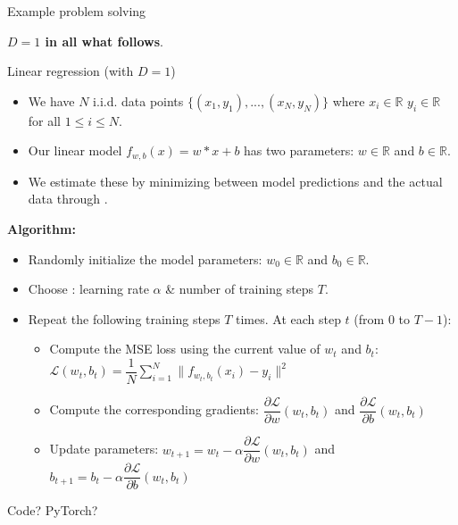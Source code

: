 \begin{frame}{Example problem solving}
\begin{minipage}{0.4\linewidth}
\begin{figure}
\end{figure}
\end{minipage}

\textbf{$D=1$ in all what follows}.
\end{frame}


\begin{frame}{Linear regression (with $D=1$)}
\vspace{-5mm}
\begin{itemize}
\item We have $N$ i.i.d. data points $\{(x_1, y_1), ..., (x_N, y_N)\}$ where $x_i\in \mathbb{R}$ $y_i\in \mathbb{R}$ for all $1 \leq i \leq N$.\\
\item Our linear model $f_{w, b}(x) = w * x + b$ has two parameters: $w \in \mathbb{R}$ and $b \in \mathbb{R}$.
\item We estimate these  by minimizing  between model predictions and the actual data through .
\end{itemize}
\vsp
\pause
\textbf{Algorithm:}
\begin{itemize}
\item Randomly initialize the model parameters: $w_0 \in \mathbb{R}$ and $b_0 \in \mathbb{R}$.
\item Choose : learning rate $\alpha$ \& number of training steps $T$.
\item Repeat the following training steps $T$ times. At each step $t$ (from 0 to $T-1$):
\vspace{-3mm}
\begin{itemize}
\item Compute the MSE loss using the current value of $w_t$ and $b_t$: $\displaystyle \mathcal{L}(w_t, b_t) = \dfrac{1}{N} \sum_{i=1}^N \|f_{w_t, b_t}(x_i) - y_i  \|^2$
\item Compute the corresponding gradients: $\dfrac{\partial \mathcal{L}}{\partial w}(w_t, b_t)$ and $\dfrac{\partial \mathcal{L}}{\partial b}(w_t, b_t)$
\item Update parameters: $w_{t+1} = w_{t} - \alpha \dfrac{\partial \mathcal{L}}{\partial w}(w_t, b_t)$ and   $b_{t+1} = b_{t} - \alpha \dfrac{\partial \mathcal{L}}{\partial b}(w_t, b_t)$
\end{itemize}
\end{itemize}
Code? PyTorch?
\end{frame}


